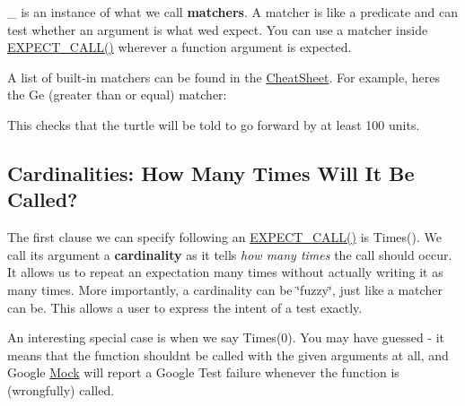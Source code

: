\begin{DoxyCode}{0}
\end{DoxyCode}


{\ttfamily \+\_\+} is an instance of what we call {\bfseries{matchers}}. A matcher is like a predicate and can test whether an argument is what we\textquotesingle{}d expect. You can use a matcher inside {\ttfamily \mbox{\hyperlink{googletest-master_2googlemock_2include_2gmock_2gmock-spec-builders_8h_a535a6156de72c1a2e25a127e38ee5232}{E\+X\+P\+E\+C\+T\+\_\+\+C\+A\+L\+L()}}} wherever a function argument is expected.

A list of built-\/in matchers can be found in the \mbox{\hyperlink{_obj__test_2lib_2googletest-release-1_88_81_2googlemock_2docs_2_cheat_sheet_8md}{Cheat\+Sheet}}. For example, here\textquotesingle{}s the {\ttfamily Ge} (greater than or equal) matcher\+:


\begin{DoxyCode}{0}
\end{DoxyCode}


This checks that the turtle will be told to go forward by at least 100 units.

\subsection*{Cardinalities\+: How Many Times Will It Be Called?}

The first clause we can specify following an {\ttfamily \mbox{\hyperlink{googletest-master_2googlemock_2include_2gmock_2gmock-spec-builders_8h_a535a6156de72c1a2e25a127e38ee5232}{E\+X\+P\+E\+C\+T\+\_\+\+C\+A\+L\+L()}}} is {\ttfamily Times()}. We call its argument a {\bfseries{cardinality}} as it tells {\itshape how many times} the call should occur. It allows us to repeat an expectation many times without actually writing it as many times. More importantly, a cardinality can be \char`\"{}fuzzy\char`\"{}, just like a matcher can be. This allows a user to express the intent of a test exactly.

An interesting special case is when we say {\ttfamily Times(0)}. You may have guessed -\/ it means that the function shouldn\textquotesingle{}t be called with the given arguments at all, and Google \mbox{\hyperlink{class_mock}{Mock}} will report a Google Test failure whenever the function is (wrongfully) called.

